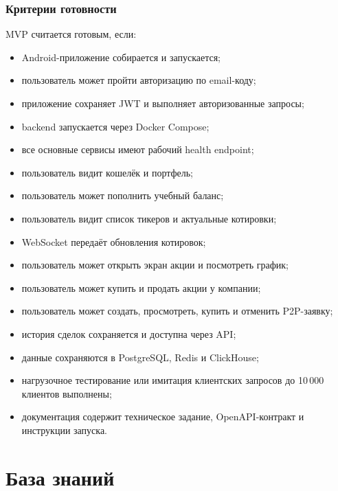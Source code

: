 \documentclass[12pt,a4paper]{article}
\begin{document}
\section{Критерии готовности}

MVP считается готовым, если:

\begin{itemize}
    \item Android-приложение собирается и запускается;
    \item пользователь может пройти авторизацию по email-коду;
    \item приложение сохраняет JWT и выполняет авторизованные запросы;
    \item backend запускается через Docker Compose;
    \item все основные сервисы имеют рабочий health endpoint;
    \item пользователь видит кошелёк и портфель;
    \item пользователь может пополнить учебный баланс;
    \item пользователь видит список тикеров и актуальные котировки;
    \item WebSocket передаёт обновления котировок;
    \item пользователь может открыть экран акции и посмотреть график;
    \item пользователь может купить и продать акции у компании;
    \item пользователь может создать, просмотреть, купить и отменить P2P-заявку;
    \item история сделок сохраняется и доступна через API;
    \item данные сохраняются в PostgreSQL, Redis и ClickHouse;
    \item нагрузочное тестирование или имитация клиентских запросов до 10\,000 клиентов выполнены;
    \item документация содержит техническое задание, OpenAPI-контракт и инструкции запуска.
\end{itemize}

\newpage
\part{База знаний}

\end{document}
